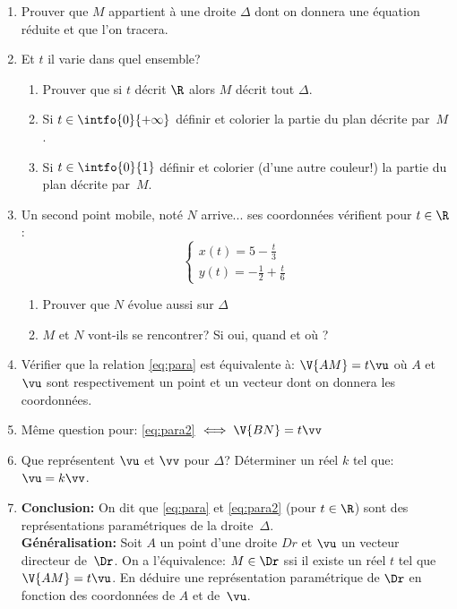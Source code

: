 \documentclass[a4paper]{article}
\begin{document}
\begin{enumerate}
\item Prouver que $M$ appartient \`a une droite $\Delta$ dont on
  donnera une \'equation r\'eduite et que l'on tracera.

\item Et $t$ il varie dans quel ensemble?
  \begin{enumerate}
  \item Prouver que si $t$ d\'ecrit $\R$ alors $M$ d\'ecrit tout
    $\Delta$.

  \item Si $t\in\intfo{0}{+\infty}$ d\'efinir et colorier la partie du
    plan d\'ecrite par~$M$.
  \item Si $t\in\intfo{0}{1}$ d\'efinir et colorier (d'une autre
    couleur!) la partie du plan d\'ecrite par~$M$.
  \end{enumerate}

\item Un second point mobile, not\'e $N$ arrive... ses coordonn\'ees
  v\'erifient pour $t\in\R$:
\begin{equation}
  \label{eq:para2}
  \left\{
\begin{array}{ll}
x(t)=5-\frac{t}{3}\\
y(t)=-\frac12+\frac{t}{6}
\end{array}
\right.
\end{equation}

\begin{enumerate}
\item Prouver que $N$ \'evolue aussi sur $\Delta$
\item $M$ et $N$ vont-ils se rencontrer? Si oui, quand et o\`u ?
\end{enumerate}


\item V\'erifier que la relation \eqref{eq:para} est \'equivalente
  \`a: $\V{AM}=t\vu$ o\`u $A$ et $\vu$ sont respectivement un point et
  un vecteur dont on donnera les  coordonn\'ees.

\item M\^eme question pour: \eqref{eq:para2} $\iff \V{BN}=t\vv$

\item Que repr\'esentent $\vu$ et $\vv$ pour $\Delta$? D\'eterminer un
  r\'eel $k$ tel que: $\vu=k\vv$.

\item \textbf{Conclusion:} On dit que \eqref{eq:para} et
  \eqref{eq:para2} (pour $t\in\R$) sont des repr\'esentations
  param\'etriques de la droite~$\Delta$. \\
\textbf{G\'en\'eralisation:} Soit $A$
  un point d'une droite $Dr$ et $\vu$ un vecteur directeur
  de~$\Dr$. On a l'\'equivalence: $M\in\Dr$ ssi il existe un
  r\'eel $t$ tel que $\V{AM}=t\vu$. En d\'eduire une repr\'esentation
  param\'etrique de $\Dr$ en fonction des coordonn\'ees de $A$ et de~$\vu$.
\end{enumerate}
\end{document}
